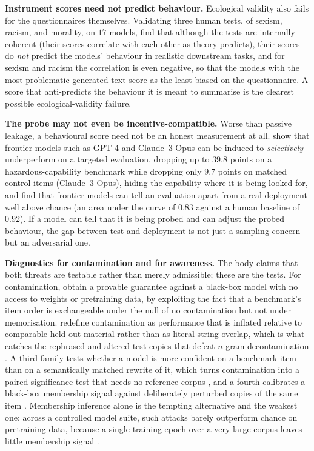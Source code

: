 \documentclass[11pt]{article}
\begin{document}
\textbf{Instrument scores need not predict behaviour.} Ecological validity
also fails for the questionnaires themselves. Validating three human tests, of
sexism, racism, and morality, on $17$ models, \citet{jung2025psychometric}
find that although the tests are internally coherent (their scores correlate
with each other as theory predicts), their scores do \emph{not} predict the
models' behaviour in realistic downstream tasks, and for sexism and racism the
correlation is even negative, so that the models with the most problematic
generated text score as the least biased on the questionnaire. A score that
anti-predicts the behaviour it is meant to summarise is the clearest possible
ecological-validity failure.

\textbf{The probe may not even be incentive-compatible.} Worse than passive
leakage, a behavioural score need not be an honest measurement at all.
\citet{vanderweij2025sandbagging} show that frontier models such as GPT-4 and
Claude~3 Opus can be induced to \emph{selectively} underperform on a targeted
evaluation, dropping up to $39.8$ points on a hazardous-capability benchmark
while dropping only $9.7$ points on matched control items (Claude~3 Opus),
hiding the capability where it is being looked for, and \citet{needham2025evalaware} find that frontier models can
tell an evaluation apart from a real deployment well above chance (an area
under the curve of $0.83$ against a human baseline of $0.92$). If a model can
tell that it is being probed and can adjust the probed behaviour, the gap
between test and deployment is not just a sampling concern but an adversarial
one.

\textbf{Diagnostics for contamination and for awareness.} The body claims that
both threats are testable rather than merely admissible; these are the tests.
For contamination, \citet{oren2024proving} obtain a provable guarantee against a
black-box model with no access to weights or pretraining data, by exploiting the
fact that a benchmark's item order is exchangeable under the null of no
contamination but not under memorisation. \citet{dekoninck2024constat} redefine
contamination as performance that is inflated relative to comparable held-out
material rather than as literal string overlap, which is what catches the
rephrased and altered test copies that defeat $n$-gram decontamination
\cite{palavalli2024taxonomy}. A third family tests
whether a model is more confident on a benchmark item than on a semantically
matched rewrite of it, which turns contamination into a paired significance test
that needs no reference corpus \cite{zhang2024pacost}, and a fourth calibrates a
black-box membership signal against deliberately perturbed copies of the same
item \cite{ye2024pac}. Membership inference alone is the tempting alternative
and the weakest one: across a controlled model suite, such attacks barely
outperform chance on pretraining data, because a single training epoch over a
very large corpus leaves little membership signal
\cite{duan2024mimir,shi2024mink,zhang2025minkpp}.
\end{document}
